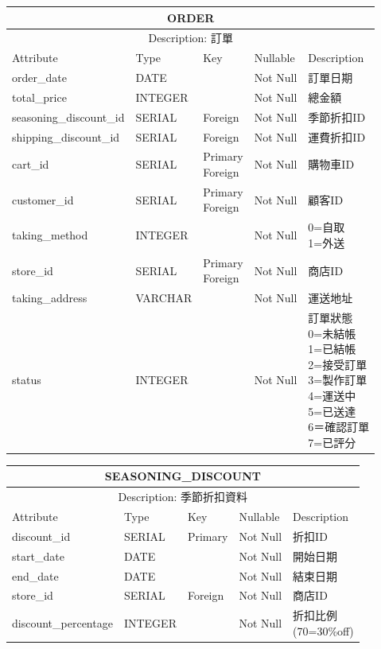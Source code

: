 \documentclass[a4paper, 12pt]{article}
\begin{document}
\noindent\begin{tabular}{ | p{7em} | p{5.5em} | p{5.5em} | p{4.5em} | p{11em} |}
  \hline
  \multicolumn{5}{|c|}{ORDER} \tabularnewline
  \hline 
  \multicolumn{5}{|c|}{Description: 訂單} \tabularnewline
  \hline 
  Attribute & Type & Key & Nullable & Description \\
  \hline
  order_date & DATE &  & Not Null & 訂單日期 \\
  \hline
  total_price & INTEGER &  & Not Null & 總金額 \\
  \hline
  seasoning_discount_id & SERIAL & Foreign&Not Null &季節折扣ID\\
  \hline
  shipping_discount_id & SERIAL & Foreign&Not Null &運費折扣ID\\
  \hline
  cart_id& SERIAL & \makecell[l]{Primary \\ Foreign} &Not Null &購物車ID\\
  \hline
  customer_id & SERIAL & \makecell[l]{Primary \\ Foreign} & Not Null & 顧客ID \\
  \hline
  taking_method & INTEGER &  & Not Null &  \makecell[l]{0=自取\\1=外送}\\
  \hline
  store_id & SERIAL & \makecell[l]{Primary \\ Foreign} & Not Null & 商店ID \\
  \hline
  taking_address & VARCHAR &  & Not Null & 運送地址 \\
  \hline
  status & INTEGER &  & Not Null & \makecell[l]{訂單狀態\\0=未結帳\\1=已結帳\\2=接受訂單\\3=製作訂單\\4=運送中\\5=已送達\\6＝確認訂單\\7=已評分} \\
  \hline
\end{tabular}


\noindent\begin{tabular}{ | p{7em} | p{5.5em} | p{5.5em} | p{4.5em} | p{11em} |}
  \hline
  \multicolumn{5}{|c|}{SEASONING_DISCOUNT} \tabularnewline
  \hline 
  \multicolumn{5}{|c|}{Description: 季節折扣資料} \tabularnewline
  \hline 
  Attribute & Type & Key & Nullable & Description \\
  \hline
  discount_id & SERIAL & Primary & Not Null & 折扣ID \\
  \hline
  start_date & DATE &  & Not Null & 開始日期 \\
  \hline
  end_date & DATE & &Not Null &結束日期\\
  \hline
  store_id& SERIAL & Foreign &Not Null &商店ID\\
  \hline
  discount_percentage & INTEGER &  &Not Null &\makecell[l]{折扣比例\\(70=30\%off)}\\
  \hline
\end{tabular}
\end{document}
